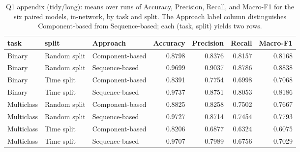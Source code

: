 \begin{table}
\caption{Q1 appendix (tidy/long): means over runs of Accuracy, Precision, Recall, and Macro-F1 for the six paired models, in-network, by task and split. The Approach label column distinguishes Component-based from Sequence-based; each (task, split) yields two rows.}
\label{tab:q1_appendix_overall}
\begin{tabular}{lllrrrr}
\toprule
task & split & Approach & Accuracy & Precision & Recall & Macro-F1 \\
\midrule
Binary & Random split & Component-based & 0.8798 & 0.8376 & 0.8157 & 0.8168 \\
Binary & Random split & Sequence-based & 0.9699 & 0.9037 & 0.8786 & 0.8838 \\
Binary & Time split & Component-based & 0.8391 & 0.7754 & 0.6998 & 0.7068 \\
Binary & Time split & Sequence-based & 0.9737 & 0.8751 & 0.8053 & 0.8186 \\
Multiclass & Random split & Component-based & 0.8825 & 0.8258 & 0.7502 & 0.7667 \\
Multiclass & Random split & Sequence-based & 0.9727 & 0.8714 & 0.7454 & 0.7793 \\
Multiclass & Time split & Component-based & 0.8206 & 0.6877 & 0.6324 & 0.6075 \\
Multiclass & Time split & Sequence-based & 0.9707 & 0.7989 & 0.6756 & 0.7029 \\
\bottomrule
\end{tabular}
\end{table}
